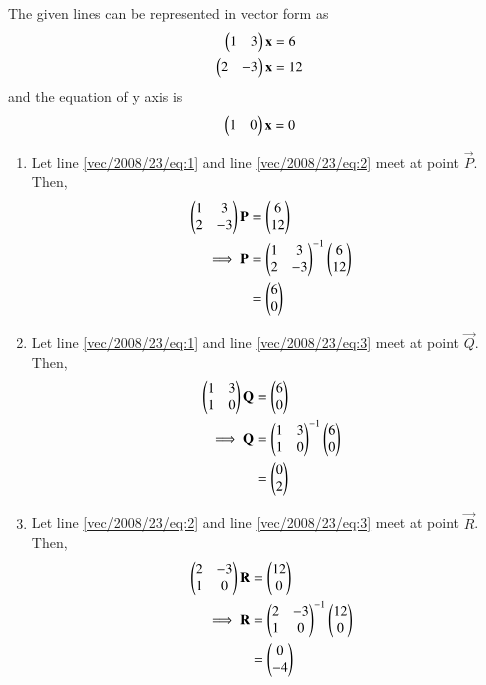 The given lines can be represented in vector form as
\begin{align}\label{vec/2008/23/eq:1}
    \begin{pmatrix}1&3\end{pmatrix}\mathbf{x}&=6 \\
    \label{vec/2008/23/eq:2}
        \begin{pmatrix}2&-3\end{pmatrix}\mathbf{x}&=12
\end{align}
and 
the equation of y axis is
\begin{align}\label{vec/2008/23/eq:3}
    \begin{pmatrix}1&0\end{pmatrix}\mathbf{x}=0
\end{align}

\begin{enumerate}
    \item Let line \eqref{vec/2008/23/eq:1} and line \eqref{vec/2008/23/eq:2} meet at point $\vec{P}$. Then,
    \begin{align}
        \begin{pmatrix}1 & 3 \\ 2 & -3\end{pmatrix}\mathbf{P}&=
    \begin{pmatrix}6 \\ 12\end{pmatrix}\\
\implies     \mathbf{P}&=\begin{pmatrix}1 & 3 \\ 2 & -3\end{pmatrix}^{-1}\begin{pmatrix}6 \\ 12\end{pmatrix}\\
&=\begin{pmatrix}6\\0\end{pmatrix}
    \end{align}
    
    \item Let line \eqref{vec/2008/23/eq:1} and line \eqref{vec/2008/23/eq:3} meet at point $\vec{Q}$. Then,
    \begin{align}
        \begin{pmatrix}1 & 3 \\ 1 & 0\end{pmatrix}\mathbf{Q}&=
    \begin{pmatrix}6 \\ 0\end{pmatrix}\\
    \implies \mathbf{Q}&=\begin{pmatrix}1 & 3 \\ 1 & 0\end{pmatrix}^{-1}\begin{pmatrix}6 \\ 0\end{pmatrix}\\
    &=\begin{pmatrix}0\\2\end{pmatrix}
    \end{align}
    
\item Let line \eqref{vec/2008/23/eq:2} and line \eqref{vec/2008/23/eq:3} meet at point $\vec{R}$. Then,
\begin{align}
    \begin{pmatrix}2 & -3 \\ 1 & 0\end{pmatrix}\mathbf{R}&=
\begin{pmatrix}12 \\ 0\end{pmatrix}\\
\implies \mathbf{R} &=\begin{pmatrix}2 & -3 \\ 1 & 0\end{pmatrix}^{-1}\begin{pmatrix}12 \\ 0\end{pmatrix}\\
&=\begin{pmatrix}0\\-4\end{pmatrix}
\end{align}
\end{enumerate}
